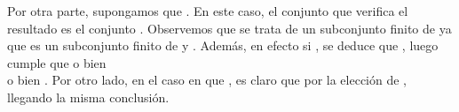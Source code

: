 \begin{isabellebody}
\begin{isamarkuptext}
\begin{demostracion}
    Por otra parte, supongamos que . En este caso, el conjunto  que verifica el
    resultado es el conjunto . Observemos que se trata de un subconjunto finito de  ya 
    que  es un subconjunto finito de  y . Además, en efecto si , se 
    deduce que , luego cumple que o bien\\  o 
    bien . Por otro lado, en el caso en que , es claro que  
    por la elección de , llegando la misma conclusión.
  \end{demostracion}


\end{isamarkuptext}
\end{isabellebody}
